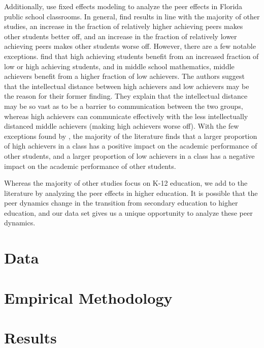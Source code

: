 \documentclass[12pt,letterpaper,english,fleqn]{article}
\begin{document}
Additionally, \citet{burke2013classroom} use fixed effects modeling to analyze the peer effects in Florida public school classrooms.
In general, \citet{burke2013classroom} find results in line with the majority of other studies, an increase in the fraction of relatively higher achieving peers makes other students better off, and an increase in the fraction of relatively lower achieving peers makes other students worse off.
However, there are a few notable exceptions.
\citet{burke2013classroom} find that high achieving students benefit from an increased fraction of low or high achieving students, and in middle school mathematics, middle achievers benefit from a higher fraction of low achievers.
The authors suggest that the intellectual distance between high achievers and low achievers may be the reason for their former finding.
They explain that the intellectual distance may be so vast as to be a barrier to communication between the two groups, whereas high achievers can communicate effectively with the less intellectually distanced middle achievers (making high achievers worse off). 
With the few exceptions found by \citet{burke2013classroom}, the majority of the literature finds that a larger proportion of high achievers in a class has a positive impact on the academic performance of other students, and a larger proportion of low achievers in a class has a negative impact on the academic performance of other students.%

Whereas the majority of other studies focus on K-12 education, we add to the literature by analyzing the peer effects in higher education. 
It is possible that the peer dynamics change in the transition from secondary education to higher education, and our data set gives us a unique opportunity to analyze these peer dynamics.

\section{Data}\label{data}



\section{Empirical Methodology}\label{methods}



\section{Results}\label{results}
\end{document}
